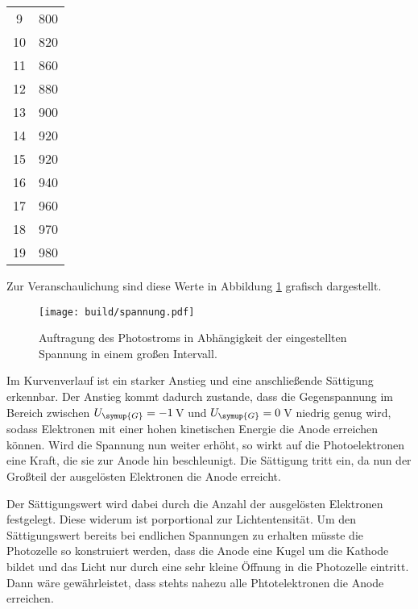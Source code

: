 \begin{table}[htp]
\begin{center}
\begin{tabular}{SS}
                          9 & 800\\
                         10 & 820\\
                         11 & 860\\
                         12 & 880\\
                         13 & 900\\
                         14 & 920\\
                         15 & 920\\
                         16 & 940\\
                         17 & 960\\
                         18 & 970\\
                         19 & 980\\
                \bottomrule
                \end{tabular}
        \end{center}
\end{table}

Zur Veranschaulichung sind diese Werte in Abbildung \ref{fig:letztes} grafisch dargestellt.

\begin{figure}
  \centering
  \texttt{[image: build/spannung.pdf]}
  \caption{Auftragung des Photostroms in Abhängigkeit der eingestellten Spannung in einem großen Intervall.}
  \label{fig:letztes}
\end{figure}

Im Kurvenverlauf ist ein starker Anstieg und eine anschließende
Sättigung erkennbar. Der Anstieg kommt dadurch zustande, dass die Gegenspannung
im Bereich zwischen $U_{\symup{G}}=-1\,$V und $U_{\symup{G}}=0\,$V niedrig genug
wird, sodass Elektronen mit einer hohen kinetischen Energie die Anode erreichen
können. Wird die Spannung nun weiter erhöht, so wirkt auf die Photoelektronen
eine Kraft, die sie zur Anode hin beschleunigt. Die Sättigung tritt ein, da
nun der Großteil der ausgelösten Elektronen die Anode erreicht.

Der Sättigungswert wird dabei durch die Anzahl der ausgelösten Elektronen
festgelegt. Diese widerum ist porportional zur Lichtentensität.
Um den Sättigungswert bereits bei endlichen Spannungen zu erhalten müsste die
Photozelle so konstruiert werden, dass die Anode eine Kugel um die Kathode bildet
und das Licht nur durch eine sehr kleine Öffnung in die Photozelle eintritt. Dann
wäre gewährleistet, dass stehts nahezu alle Phtotelektronen die Anode erreichen.


